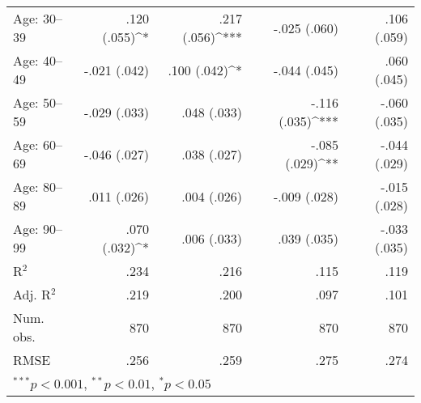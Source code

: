 \begin{tabular}{l D{)}{)}{11)3} D{)}{)}{11)3} D{)}{)}{11)3} D{)}{)}{11)3} }
Age: 30--39                           & .120 \; (.055)^{*}    & .217 \; (.056)^{***}  & -.025 \; (.060)       & .106 \; (.059)        \\
Age: 40--49                           & -.021 \; (.042)       & .100 \; (.042)^{*}    & -.044 \; (.045)       & .060 \; (.045)        \\
Age: 50--59                           & -.029 \; (.033)       & .048 \; (.033)        & -.116 \; (.035)^{***} & -.060 \; (.035)       \\
Age: 60--69                           & -.046 \; (.027)       & .038 \; (.027)        & -.085 \; (.029)^{**}  & -.044 \; (.029)       \\
Age: 80--89                           & .011 \; (.026)        & .004 \; (.026)        & -.009 \; (.028)       & -.015 \; (.028)       \\
Age: 90--99                           & .070 \; (.032)^{*}    & .006 \; (.033)        & .039 \; (.035)        & -.033 \; (.035)       \\
\midrule
R$^2$                                 & .234                  & .216                  & .115                  & .119                  \\
Adj. R$^2$                            & .219                  & .200                  & .097                  & .101                  \\
Num. obs.                             & 870                   & 870                   & 870                   & 870                   \\
RMSE                                  & .256                  & .259                  & .275                  & .274                  \\
\bottomrule
{}
\end{tabular}

